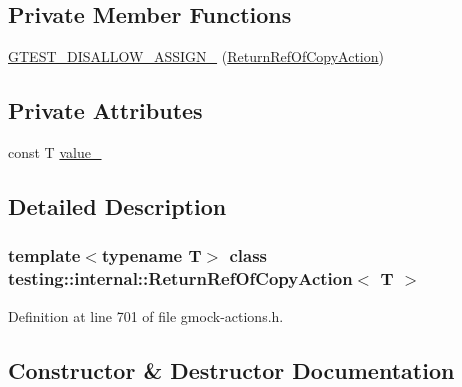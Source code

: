 \subsection*{Private Member Functions}
\begin{DoxyCompactItemize}
\item 
\hyperlink{classtesting_1_1internal_1_1ReturnRefOfCopyAction_a767fa5d48c046e472eaf2353c2e7544c}{G\+T\+E\+S\+T\+\_\+\+D\+I\+S\+A\+L\+L\+O\+W\+\_\+\+A\+S\+S\+I\+G\+N\+\_\+} (\hyperlink{classtesting_1_1internal_1_1ReturnRefOfCopyAction}{Return\+Ref\+Of\+Copy\+Action})
\end{DoxyCompactItemize}
\subsection*{Private Attributes}
\begin{DoxyCompactItemize}
\item 
const T \hyperlink{classtesting_1_1internal_1_1ReturnRefOfCopyAction_a41fdd44b2021e01db916c6d5afcbf73f}{value\+\_\+}
\end{DoxyCompactItemize}


\subsection{Detailed Description}
\subsubsection*{template$<$typename T$>$\newline
class testing\+::internal\+::\+Return\+Ref\+Of\+Copy\+Action$<$ T $>$}



Definition at line 701 of file gmock-\/actions.\+h.



\subsection{Constructor \& Destructor Documentation}
\mbox{\label{classtesting_1_1internal_1_1ReturnRefOfCopyAction_a073c18a8b50423b08f6603e860622839}} 

